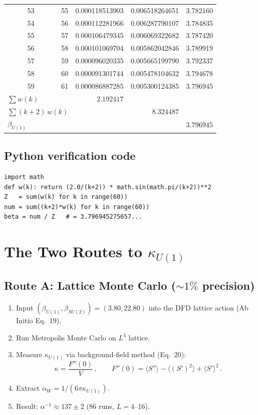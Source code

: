 \documentclass[12pt,a4paper]{article}
\theoremstyle{definition}
\begin{document}
{\begin{longtable}{rr@{\quad}r@{\quad}r@{\quad}r}
53 & 55 & 0.000118513903 & 0.006518264651 & 3.782160 \\
54 & 56 & 0.000112281966 & 0.006287790107 & 3.784835 \\
55 & 57 & 0.000106479345 & 0.006069322682 & 3.787420 \\
56 & 58 & 0.000101069704 & 0.005862042846 & 3.789919 \\
57 & 59 & 0.000096020335 & 0.005665199790 & 3.792337 \\
58 & 60 & 0.000091301744 & 0.005478104632 & 3.794678 \\
59 & 61 & 0.000086887285 & 0.005300124385 & 3.796945 \\
\midrule
\multicolumn{2}{l}{$\sum w(k)$} & $2.192417$ & & \\
\multicolumn{2}{l}{$\sum (k{+}2)\,w(k)$} & & $8.324487$ & \\
\multicolumn{2}{l}{$\beta_{U(1)}$} & & & $\mathbf{3.796945}$ \\
\bottomrule
\end{longtable}
}

\subsection{Python verification code}

\begin{verbatim}
import math
def w(k): return (2.0/(k+2)) * math.sin(math.pi/(k+2))**2
Z   = sum(w(k) for k in range(60))
num = sum((k+2)*w(k) for k in range(60))
beta = num / Z   # = 3.796945275657...
\end{verbatim}

\section{The Two Routes to $\kappa_{U(1)}$}
\label{sec:routes}

\subsection{Route A: Lattice Monte Carlo ($\sim 1\%$ precision)}

\begin{enumerate}
\item Input $(\beta_{U(1)}, \beta_{SU(2)}) = (3.80, 22.80)$ into
  the DFD lattice action (Ab Initio Eq.~19).
\item Run Metropolis Monte Carlo on $L^4$ lattice.
\item Measure $\kappa_{U(1)}$ via background-field method (Eq.~20):
  \begin{equation}
  \kappa = \frac{F''(0)}{V}\,,\qquad
  F''(0) = \langle S'' \rangle - \langle (S')^2 \rangle + \langle S' \rangle^2\,.
  \end{equation}
\item Extract $\alpha_W = 1/(6\pi\kappa_{U(1)})$.
\item Result: $\alpha^{-1} \approx 137 \pm 2$ (86 runs, $L=4$--16).
\end{enumerate}
\end{document}

